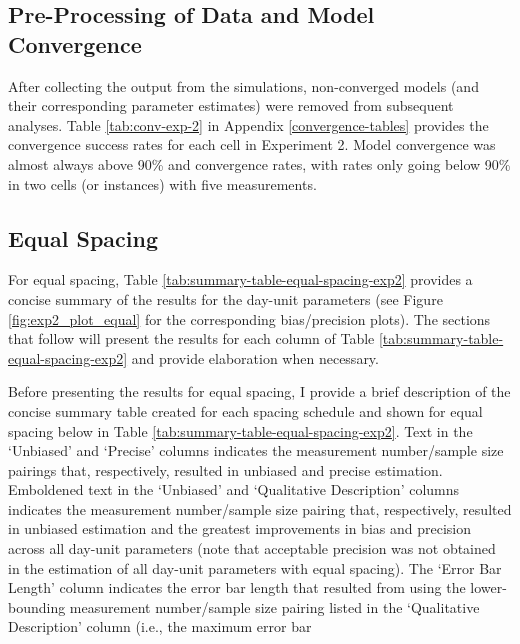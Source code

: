 \documentclass[
12pt, %
twoside,
english]{guelphthesis}
\begin{document}
\hypertarget{pre-processing-of-data-and-model-convergence-1}{%
\subsection{Pre-Processing of Data and Model Convergence}\label{pre-processing-of-data-and-model-convergence-1}}

After collecting the output from the simulations, non-converged models
(and their corresponding parameter estimates) were removed from
subsequent analyses. Table \ref{tab:conv-exp-2} in Appendix \ref{convergence-tables} provides the convergence
success rates for each cell in Experiment 2. Model convergence was almost always above 90\% and convergence rates, with rates only going below 90\% in two cells (or instances) with five measurements.

\hypertarget{concise-example}{%
\subsection{Equal Spacing}\label{concise-example}}

For equal spacing, Table \ref{tab:summary-table-equal-spacing-exp2} provides a concise summary of the results for the day-unit parameters (see Figure \ref{fig:exp2_plot_equal} for the corresponding bias/precision plots). The sections that follow will present the results for each column of Table \ref{tab:summary-table-equal-spacing-exp2} and provide elaboration when necessary.

Before presenting the results for equal spacing, I provide a brief description of the concise summary table created for each spacing schedule and shown for equal spacing below in Table \ref{tab:summary-table-equal-spacing-exp2}. Text in the `Unbiased' and `Precise' columns indicates the measurement number/sample size pairings that, respectively, resulted in unbiased and precise estimation. Emboldened text in the `Unbiased' and `Qualitative Description' columns indicates the measurement number/sample size pairing that, respectively, resulted in unbiased estimation and the greatest improvements in bias and precision across all day-unit parameters (note that acceptable precision was not obtained in the estimation of all day-unit parameters with equal spacing). The `Error Bar Length' column indicates the error bar length that resulted from using the lower-bounding measurement number/sample size pairing listed in the `Qualitative Description' column (i.e., the maximum error bar
\end{document}
